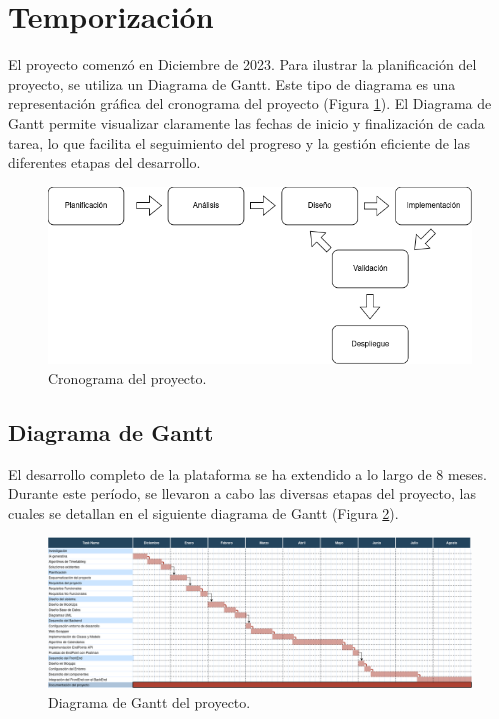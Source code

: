 \section{Temporización}

El proyecto comenzó en Diciembre de 2023. Para ilustrar la planificación del proyecto, se utiliza un Diagrama de Gantt. Este tipo de diagrama es una representación gráfica del cronograma del proyecto (Figura \ref{fig:cronograma}). El Diagrama de Gantt permite visualizar claramente las fechas de inicio y finalización de cada tarea, lo que facilita el seguimiento del progreso y la gestión eficiente de las diferentes etapas del desarrollo.

\begin{figure}[H]
    \centering
    \includegraphics[width=1\textwidth]{imagenes/cronograma.png}
    \caption{Cronograma del proyecto.}
    \label{fig:cronograma}
\end{figure}

\subsection{Diagrama de Gantt}

El desarrollo completo de la plataforma se ha extendido a lo largo de 8 meses. Durante este período, se llevaron a cabo las diversas etapas del proyecto, las cuales se detallan en el siguiente diagrama de Gantt (Figura \ref{fig:gantt}).

\begin{figure}[H]
    \centering
    \includegraphics[width=1\textwidth]{imagenes/gantt.png}
    \caption{Diagrama de Gantt del proyecto.}
    \label{fig:gantt}
\end{figure}

